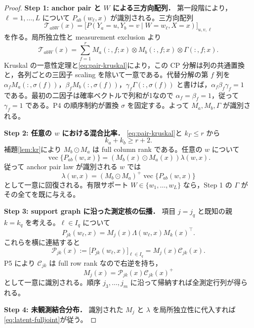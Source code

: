 \documentclass[11pt,a4paper]{ltjsarticle}
\theoremstyle{remark}\newtheorem{remark}{注意}[section]
\newcommand{\vecop}{\operatorname{vec}}
\newcommand{\od}{\odot}
\begin{document}
\begin{proof}
\textbf{Step 1: anchor pair と $W$ による三方向配列．}
第一段階により，$\ell=1,\ldots,L$ について $P_{ab}(w_\ell,x)$ が識別される。三方向配列
\[
\mathcal T_{abW}(x)
=\big[P(Y_a=u,Y_b=v\mid W=w_\ell,X=x)\big]_{u,v,\ell}
\]
を作る。局所独立性と measurement exclusion より
\begin{equation}
\mathcal T_{abW}(x)
=\sum_{f=1}^r M_a(:,f;x)\otimes M_b(:,f;x)\otimes\Gamma(:,f;x).
\label{eq:pair-cp}
\end{equation}
Kruskal の一意性定理と\eqref{eq:pair-kruskal}により，この CP 分解は列の共通置換と，各列ごとの三因子 scaling を除いて一意である。代替分解の第 $f$ 列を
$\alpha_fM_a(:,\sigma(f))$，$\beta_fM_b(:,\sigma(f))$，$\gamma_f\Gamma(:,\sigma(f))$ と書けば，$\alpha_f\beta_f\gamma_f=1$ である。最初の二因子は確率ベクトルで列和が1なので $\alpha_f=\beta_f=1$，従って $\gamma_f=1$ である。P4 の順序制約が置換 $\sigma$ を固定する。よって $M_a,M_b,\Gamma$ が識別される。

\textbf{Step 2: 任意の $w$ における混合比率．}
\eqref{eq:pair-kruskal}と $k_\Gamma\le r$ から
\[
k_a+k_b\ge r+2.
\]
補題\ref{lem:kr}により $M_b\od M_a$ は full column rank である。任意の $w$ について
\begin{equation}
\vecop\{P_{ab}(w,x)\}
=(M_b(x)\od M_a(x))\lambda(w,x).
\label{eq:lambda-inversion}
\end{equation}
従って anchor pair law が識別される $w$ では
\[
\lambda(w,x)=(M_b\od M_a)^+\vecop\{P_{ab}(w,x)\}
\]
として一意に回復される。有限サポート $W\in\{w_1,\ldots,w_L\}$ なら，Step 1 の $\Gamma$ がその全てを既に与える。

\textbf{Step 3: support graph に沿った測定核の伝播．}
項目 $j=j_q$ と既知の親 $k=k_q$ を考える。$\ell\in I_q$ について
\[
P_{jk}(w_\ell,x)=M_j(x)\Lambda(w_\ell,x)M_k(x)^\top.
\]
これらを横に連結すると
\begin{equation}
\mathcal P_{jk}(x):=
\big[P_{jk}(w_\ell,x)\big]_{\ell\in I_q}
=M_j(x)\mathcal C_{jk}(x).
\label{eq:propagate}
\end{equation}
P5 により $\mathcal C_{jk}$ は full row rank なので右逆を持ち，
\begin{equation}
M_j(x)=\mathcal P_{jk}(x)\mathcal C_{jk}(x)^+
\label{eq:Mj-propagate}
\end{equation}
として一意に識別される。順序 $j_3,\ldots,j_m$ に沿って帰納すれば全測定行列が得られる。

\textbf{Step 4: 未観測結合分布．}
識別された $M_j$ と $\lambda$ を局所独立性に代入すれば\eqref{eq:latent-fulljoint}が従う。
\end{proof}
\end{document}
